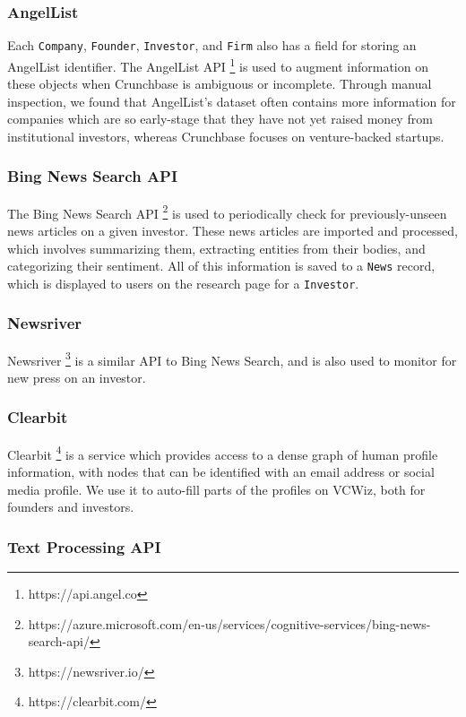 \subsubsection{AngelList}

Each \texttt{Company}, \texttt{Founder}, \texttt{Investor}, and \texttt{Firm} also has a field for storing an AngelList identifier. The AngelList API \footnote{https://api.angel.co} is used to augment information on these objects when Crunchbase is ambiguous or incomplete. Through manual inspection, we found that AngelList's dataset often contains more information for companies which are so early-stage that they have not yet raised money from institutional investors, whereas Crunchbase focuses on venture-backed startups.

\subsubsection{Bing News Search API}

The Bing News Search API \footnote{https://azure.microsoft.com/en-us/services/cognitive-services/bing-news-search-api/} is used to periodically check for previously-unseen news articles on a given investor. These news articles are imported and processed, which involves summarizing them, extracting entities from their bodies, and categorizing their sentiment. All of this information is saved to a \texttt{News} record, which is displayed to users on the research page for a \texttt{Investor}.

\subsubsection{Newsriver}

Newsriver \footnote{https://newsriver.io/} is a similar API to Bing News Search, and is also used to monitor for new press on an investor.

\subsubsection{Clearbit}

Clearbit \footnote{https://clearbit.com/} is a service which provides access to a dense graph of human profile information, with nodes that can be identified with an email address or social media profile. We use it to auto-fill parts of the profiles on VCWiz, both for founders and investors.

\subsubsection{Text Processing API}


